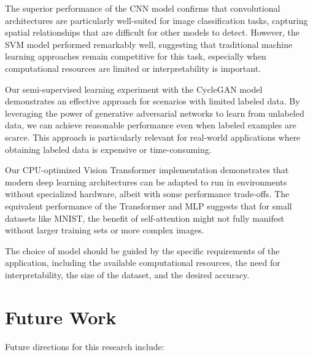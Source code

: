 \documentclass{article}
\begin{document}
The superior performance of the CNN model confirms that convolutional architectures are particularly well-suited for image classification tasks, capturing spatial relationships that are difficult for other models to detect. However, the SVM model performed remarkably well, suggesting that traditional machine learning approaches remain competitive for this task, especially when computational resources are limited or interpretability is important.

Our semi-supervised learning experiment with the CycleGAN model demonstrates an effective approach for scenarios with limited labeled data. By leveraging the power of generative adversarial networks to learn from unlabeled data, we can achieve reasonable performance even when labeled examples are scarce. This approach is particularly relevant for real-world applications where obtaining labeled data is expensive or time-consuming.

Our CPU-optimized Vision Transformer implementation demonstrates that modern deep learning architectures can be adapted to run in environments without specialized hardware, albeit with some performance trade-offs. The equivalent performance of the Transformer and MLP suggests that for small datasets like MNIST, the benefit of self-attention might not fully manifest without larger training sets or more complex images.

The choice of model should be guided by the specific requirements of the application, including the available computational resources, the need for interpretability, the size of the dataset, and the desired accuracy.

\section{Future Work}
Future directions for this research include:
\end{document}
